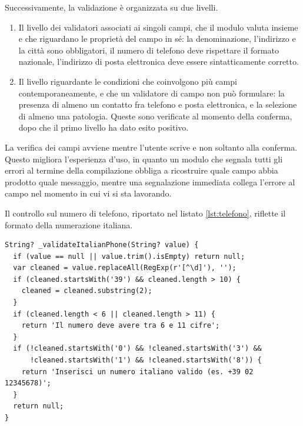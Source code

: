 Successivamente, la validazione è organizzata su due livelli.%

\begin{enumerate}
  \item Il livello dei validatori associati ai singoli campi, che il modulo valuta insieme e che riguardano le proprietà
  del campo in sé: la denominazione, l'indirizzo e la città sono obbligatori, il numero di telefono deve rispettare il
  formato nazionale, l'indirizzo di posta elettronica deve essere sintatticamente corretto.
  \item Il livello riguardante le condizioni che coinvolgono più campi contemporaneamente, e che un validatore di campo non può
  formulare: la presenza di almeno un contatto fra telefono e posta elettronica, e la selezione di almeno una patologia.
  Queste sono verificate al momento della conferma, dopo che il primo livello ha dato esito positivo.
\end{enumerate}

La verifica dei campi avviene mentre l'utente scrive e non soltanto alla conferma.
Questo migliora l'esperienza d'uso, in quanto un modulo che segnala tutti gli errori al termine della
compilazione obbliga a ricostruire quale campo abbia prodotto quale messaggio, mentre una segnalazione immediata collega
l'errore al campo nel momento in cui vi si sta lavorando.

Il controllo sul numero di telefono, riportato nel listato \ref{lst:telefono},
riflette il formato della numerazione italiana. %

\begin{listing}[H]
\begin{verbatim}
String? _validateItalianPhone(String? value) {
  if (value == null || value.trim().isEmpty) return null;
  var cleaned = value.replaceAll(RegExp(r'[^\d]'), '');
  if (cleaned.startsWith('39') && cleaned.length > 10) {
    cleaned = cleaned.substring(2);
  }
  if (cleaned.length < 6 || cleaned.length > 11) {
    return 'Il numero deve avere tra 6 e 11 cifre';
  }
  if (!cleaned.startsWith('0') && !cleaned.startsWith('3') &&
      !cleaned.startsWith('1') && !cleaned.startsWith('8')) {
    return 'Inserisci un numero italiano valido (es. +39 02 12345678)';
  }
  return null;
}
\end{verbatim}
\caption{Validazione del numero di telefono secondo il formato della numerazione italiana.}
\label{lst:telefono}
\end{listing}

